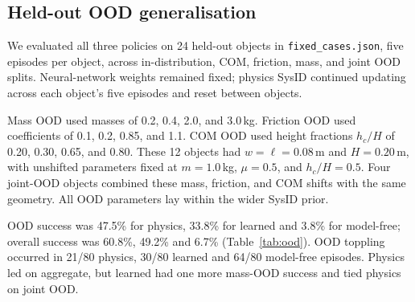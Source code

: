 \documentclass[12pt]{article}
\begin{document}
\subsection{Held-out OOD generalisation}\label{sec:ood}
We evaluated all three policies on 24 held-out objects in \texttt{fixed\_cases.json}, five episodes per object, across in-distribution, COM, friction, mass, and joint OOD splits. Neural-network weights remained fixed; physics SysID continued updating across each object's five episodes and reset between objects.

Mass OOD used masses of 0.2, 0.4, 2.0, and 3.0\,kg. Friction OOD used coefficients of 0.1, 0.2, 0.85, and 1.1. COM OOD used height fractions $h_c/H$ of 0.20, 0.30, 0.65, and 0.80. These 12 objects had $w=\ell=0.08$\,m and $H=0.20$\,m, with unshifted parameters fixed at $m=1.0$\,kg, $\mu=0.5$, and $h_c/H=0.5$. Four joint-OOD objects combined these mass, friction, and COM shifts with the same geometry. All OOD parameters lay within the wider SysID prior.

OOD success was 47.5\% for physics, 33.8\% for learned and 3.8\% for model-free; overall success was 60.8\%, 49.2\% and 6.7\% (Table~\ref{tab:ood}). OOD toppling occurred in 21/80 physics, 30/80 learned and 64/80 model-free episodes. Physics led on aggregate, but learned had one more mass-OOD success and tied physics on joint OOD.
\end{document}
